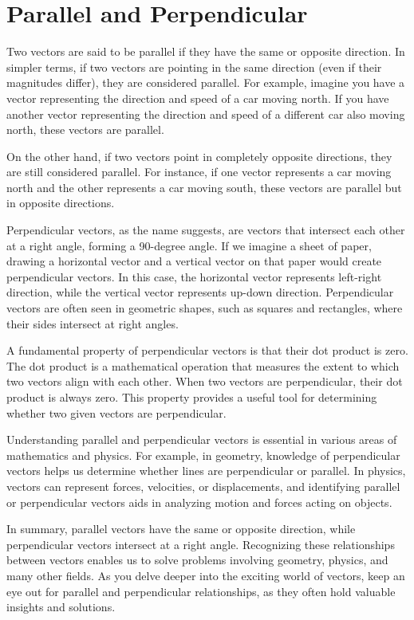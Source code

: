 \chapter{Parallel and Perpendicular}

Two vectors are said to be parallel if they have the same or opposite
direction. In simpler terms, if two vectors are pointing in the same
direction (even if their magnitudes differ), they are considered
parallel. For example, imagine you have a vector representing the
direction and speed of a car moving north. If you have another vector
representing the direction and speed of a different car also moving
north, these vectors are parallel.

On the other hand, if two vectors point in completely opposite
directions, they are still considered parallel. For instance, if one
vector represents a car moving north and the other represents a car
moving south, these vectors are parallel but in opposite directions.

Perpendicular vectors, as the name suggests, are vectors that
intersect each other at a right angle, forming a 90-degree angle. If
we imagine a sheet of paper, drawing a horizontal vector and a
vertical vector on that paper would create perpendicular vectors. In
this case, the horizontal vector represents left-right direction,
while the vertical vector represents up-down direction. Perpendicular
vectors are often seen in geometric shapes, such as squares and
rectangles, where their sides intersect at right angles.

A fundamental property of perpendicular vectors is that their dot
product is zero. The dot product is a mathematical operation that
measures the extent to which two vectors align with each other. When
two vectors are perpendicular, their dot product is always zero. This
property provides a useful tool for determining whether two given
vectors are perpendicular.

Understanding parallel and perpendicular vectors is essential in
various areas of mathematics and physics. For example, in geometry,
knowledge of perpendicular vectors helps us determine whether lines
are perpendicular or parallel. In physics, vectors can represent
forces, velocities, or displacements, and identifying parallel or
perpendicular vectors aids in analyzing motion and forces acting on
objects.

In summary, parallel vectors have the same or opposite direction,
while perpendicular vectors intersect at a right angle. Recognizing
these relationships between vectors enables us to solve problems
involving geometry, physics, and many other fields. As you delve
deeper into the exciting world of vectors, keep an eye out for
parallel and perpendicular relationships, as they often hold valuable
insights and solutions.
